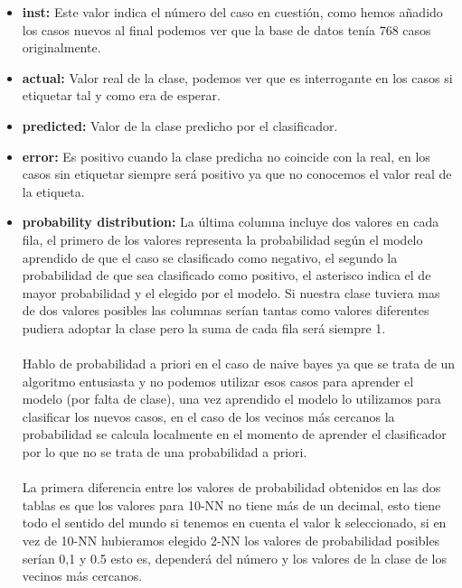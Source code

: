 \documentclass[es]{ifirak}
\begin{document}
\begin{itemize}
	\item \textbf{inst:} Este valor indica el número del caso en cuestión, como hemos añadido los casos nuevos al final podemos ver que la base de datos tenía 768 casos originalmente.
	\item	\textbf{actual:} Valor real de la clase, podemos ver que es interrogante en los casos si etiquetar tal y como era de esperar.
	\item	\textbf{predicted:} Valor de la clase predicho por el clasificador.
	\item	\textbf{error:} Es positivo cuando la clase predicha no coincide con la real, en los casos sin etiquetar siempre será positivo ya que no conocemos el valor real de la etiqueta.
	\item	\textbf{probability distribution:} La última columna incluye dos valores en cada fila, el primero de los valores representa la probabilidad según el modelo aprendido de que el caso se clasificado como negativo, el segundo la probabilidad de que sea clasificado como positivo, el asterisco indica el de mayor probabilidad y el elegido por el modelo. Si nuestra clase tuviera mas de dos valores posibles las columnas serían tantas como valores diferentes pudiera adoptar la clase pero la suma de cada fila será siempre 1.
	\paragraph{}
	Hablo de probabilidad a priori en el caso de naive bayes ya que se trata de un algoritmo entusiasta y no podemos utilizar esos casos para aprender el modelo (por falta de clase), una vez aprendido el modelo lo utilizamos para clasificar los nuevos casos, en el caso de los vecinos más cercanos la probabilidad se calcula localmente en el momento de aprender el clasificador por lo que no se trata de una probabilidad a priori.
	\paragraph{}
	La primera diferencia entre los valores de probabilidad obtenidos en las dos tablas es que los valores para 10-NN no tiene más de un decimal, esto tiene todo el sentido del mundo si tenemos en cuenta el valor k seleccionado, si en vez de 10-NN hubieramos elegido 2-NN los valores de probabilidad posibles serían 0,1 y 0.5 esto es, dependerá del número y los valores de la clase de los vecinos más cercanos.
\end{itemize}
\pagebreak
\end{document}
